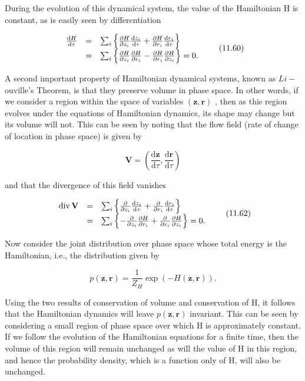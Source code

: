 \documentclass[
  10
]{article}
\author{}
\date{}
\begin{document}
During the evolution of this dynamical system, the value of the
Hamiltonian H is constant, as is easily seen by differentiation

\[
\begin{array}{r c l} \frac {\mathrm{d} H}{\mathrm{d} \tau} & = & \sum_ {i} \left\{\frac {\partial H}{\partial z _ {i}} \frac {\mathrm{d} z _ {i}}{\mathrm{d} \tau} + \frac {\partial H}{\partial r _ {i}} \frac {\mathrm{d} r _ {i}}{\mathrm{d} \tau} \right\} \\ & = & \sum_ {i} \left\{\frac {\partial H}{\partial z _ {i}} \frac {\partial H}{\partial r _ {i}} - \frac {\partial H}{\partial r _ {i}} \frac {\partial H}{\partial z _ {i}} \right\} = 0. \end{array}\tag{11.60}
\]

A second important property of Hamiltonian dynamical systems, known as
\(L i -\) ouville's Theorem, is that they preserve volume in phase
space. In other words, if we consider a region within the space of
variables \(( \mathbf { z } , \mathbf { r } )\) , then as this region
evolves under the equations of Hamiltonian dynamics, its shape may
change but its volume will not. This can be seen by noting that the flow
field (rate of change of location in phase space) is given by

\[
\mathbf {V} = \left(\frac {\mathrm{d} \mathbf {z}}{\mathrm{d} \tau}, \frac {\mathrm{d} \mathbf {r}}{\mathrm{d} \tau}\right)\tag{11.61}
\]

and that the divergence of this field vanishes

\[
\begin{array}{r c l} \operatorname{div} \mathbf {V} & = & \sum_ {i} \left\{\frac {\partial}{\partial z _ {i}} \frac {\mathrm{d} z _ {i}}{\mathrm{d} \tau} + \frac {\partial}{\partial r _ {i}} \frac {\mathrm{d} r _ {i}}{\mathrm{d} \tau} \right\} \\ & = & \sum_ {i} \left\{- \frac {\partial}{\partial z _ {i}} \frac {\partial H}{\partial r _ {i}} + \frac {\partial}{\partial r _ {i}} \frac {\partial H}{\partial z _ {i}} \right\} = 0. \end{array}\tag{11.62}
\]

Now consider the joint distribution over phase space whose total energy
is the Hamiltonian, i.e., the distribution given by

\[
p (\mathbf {z}, \mathbf {r}) = \frac {1}{Z _ {H}} \exp (- H (\mathbf {z}, \mathbf {r})).\tag{11.63}
\]

Using the two results of conservation of volume and conservation of H,
it follows that the Hamiltonian dynamics will leave
\(p ( \mathbf { z } , \mathbf { r } )\) invariant. This can be seen by
considering a small region of phase space over which H is approximately
constant. If we follow the evolution of the Hamiltonian equations for a
finite time, then the volume of this region will remain unchanged as
will the value of H in this region, and hence the probability density,
which is a function only of H, will also be unchanged.
\end{document}
